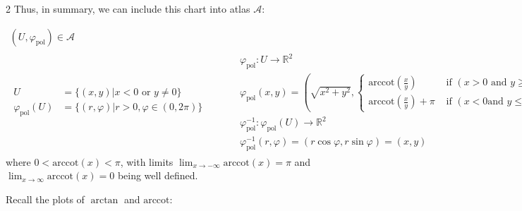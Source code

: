 \documentclass[10pt]{amsart}
\begin{document}
\begin{multicols*}{2}
Thus, in summary, we can include this chart into atlas $\mathcal{A}$:

\begin{equation} \label{Eq:UR2}
	\begin{gathered}
		(U, \varphi_{\text{pol}}) \in \mathcal{A} \\ 
		\begin{aligned}
			U & = \lbrace (x,y) | x<0 \text{ or } y \neq 0 \rbrace  \\
			\varphi_{\text{pol}}(U) & = \lbrace (r,\varphi) | r >0, \varphi \in (0,2\pi) \rbrace
		\end{aligned} \quad \quad \, \begin{aligned}
			& \varphi_{\text{pol}}:U \to \mathbb{R}^2 \\ 
			& \varphi_{\text{pol}}(x,y) = ( \sqrt{x^2 + y^2}, \begin{cases} \text{arccot}{ \left( \frac{x}{y} \right) }  & \text{ if } (x > 0 \text{ and } y \geq 0 ) \text{ or } (x > 0 \text{ and } y \leq 0) \\ \text{arccot}{ \left( \frac{x}{y} \right) } + \pi & \text{ if } ( x < 0 \text{and } y \leq 0) \text{ or } (x \geq 0 \text{ and } y < 0) \end{cases} ) \\ 
			& \varphi^{-1}_{\text{pol}}: \varphi_{\text{pol}}(U) \to \mathbb{R}^2 \\ 
			& \varphi^{-1}_{\text{pol}}(r,\varphi) = (r\cos{\varphi}, r\sin{\varphi}) = (x,y)
		\end{aligned}
	\end{gathered}
\end{equation}
where $0 < \text{arccot}(x) < \pi$, with limits $\lim_{x \to -\infty} \text{arccot}(x) = \pi$ and $\lim_{x \to \infty} \text{arccot}(x) = 0$ being well defined.

Recall the plots of $\arctan$ and $\text{arccot}$:



\end{multicols*}
\end{document}
